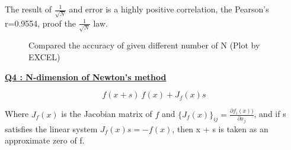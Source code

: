 \documentclass{article}
\begin{document}
The result of $\frac{1}{\sqrt{N}}$ and error is a highly positive correlation, the Pearson's r=0.9554, proof the $\frac{1}{\sqrt{N}}$ law.
\begin{figure}[h]
    \centering
    \caption{Compared the accuracy of given different number of N (Plot by  EXCEL)}
    \label{fig:3b1}
\end{figure}

\underline{\textbf{Q4 : N-dimension of Newton's method}}

\begin{equation}
    f(x+s)~f(x)+J_f(x)s
\end{equation}

Where $J_f(x)$ is the Jacobian matrix of $f$ and 
$\{J_f(x)\}_{ij}=\frac{\partial f_i(x))}{\partial x_j}$, and if s satisfies the linear
system ${J_f(x)}s=-f(x)$, then x + s is taken as an approximate zero of f.
\end{document}
